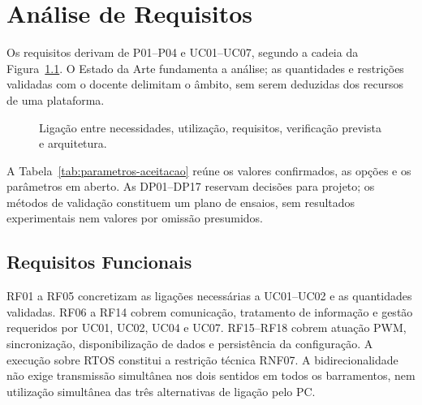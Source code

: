 \chapter{Análise de Requisitos}
\label{cap:requisitos}

Os requisitos derivam de P01--P04 e UC01--UC07, segundo a cadeia da
Figura~\ref{fig:cadeia-requisitos}. O Estado da Arte fundamenta a análise;
as quantidades e restrições validadas com o docente delimitam o âmbito,
sem serem deduzidas dos recursos de uma plataforma.

\begin{figure}[htbp]
    \centering
    \caption[Cadeia de rastreabilidade dos requisitos.]{Ligação entre necessidades, utilização, requisitos, verificação prevista e arquitetura.}
    \label{fig:cadeia-requisitos}
\end{figure}

A Tabela~\ref{tab:parametros-aceitacao} reúne os valores confirmados,
as opções e os parâmetros em aberto. As DP01--DP17 reservam decisões
para projeto; os métodos de validação constituem um plano de ensaios,
sem resultados experimentais nem valores por omissão presumidos.

\section{Requisitos Funcionais}

RF01 a RF05 concretizam as ligações necessárias a UC01--UC02 e as
quantidades validadas. RF06 a RF14 cobrem comunicação, tratamento de
informação e gestão requeridos por UC01, UC02, UC04 e UC07.
RF15--RF18 cobrem atuação PWM, sincronização, disponibilização de dados e
persistência da configuração.
A execução sobre RTOS constitui a restrição técnica RNF07. A
bidirecionalidade não exige transmissão simultânea nos dois
sentidos em todos os barramentos, nem utilização simultânea das três
alternativas de ligação pelo PC.

